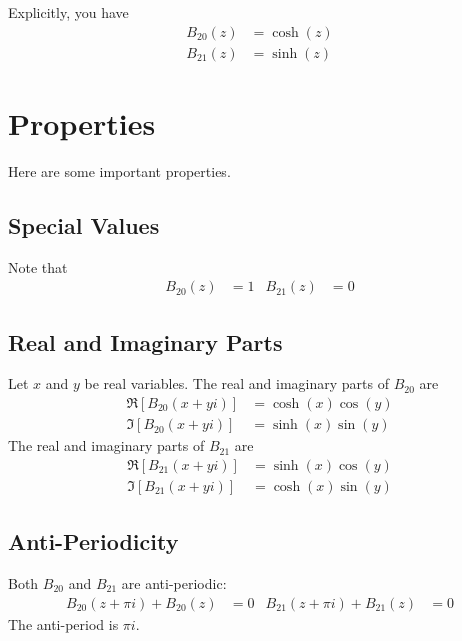 Explicitly, you have
\begin{align}
    B_{20}(z) &= \cosh(z) \\ B_{21}(z) &= \sinh(z)
\end{align}
\section{Properties}
Here are some important properties.
\subsection{Special Values}
Note that
\begin{align}
    B_{20}(z) &= 1 & B_{21}(z) &= 0
\end{align}
\subsection{Real and Imaginary Parts}
Let $x$ and $y$ be real variables. The real and imaginary parts of $B_{20}$ are
\begin{align}
    \Re\left[ B_{20}(x + yi) \right] &= \cosh(x) \cos(y) \\
    \Im\left[ B_{20}(x + yi) \right] &= \sinh(x) \sin(y)
\end{align}
The real and imaginary parts of $B_{21}$ are
\begin{align}
    \Re\left[ B_{21}(x + yi) \right] &= \sinh(x) \cos(y) \\
    \Im\left[ B_{21}(x + yi) \right] &= \cosh(x) \sin(y)
\end{align}
\subsection{Anti-Periodicity}
Both $B_{20}$ and $B_{21}$ are anti-periodic:
\begin{align}
    B_{20}(z + \pi i) + B_{20}(z) &= 0 & B_{21}(z + \pi i) + B_{21}(z) &= 0
\end{align}
The anti-period is $\pi i$.
